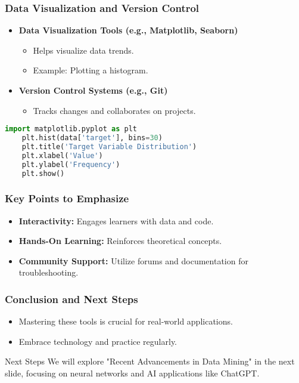 \documentclass[aspectratio=169]{beamer}
\begin{document}
\begin{frame}[fragile]
    \frametitle{Data Visualization and Version Control}
    \begin{itemize}
        \item \textbf{Data Visualization Tools (e.g., Matplotlib, Seaborn)}
            \begin{itemize}
                \item Helps visualize data trends.
                \item Example: Plotting a histogram.
            \end{itemize}
        \item \textbf{Version Control Systems (e.g., Git)}
            \begin{itemize}
                \item Tracks changes and collaborates on projects.
            \end{itemize}
    \end{itemize}
    
    \begin{lstlisting}[language=Python]
    import matplotlib.pyplot as plt
    plt.hist(data['target'], bins=30)
    plt.title('Target Variable Distribution')
    plt.xlabel('Value')
    plt.ylabel('Frequency')
    plt.show()
    \end{lstlisting}
\end{frame}

\begin{frame}
    \frametitle{Key Points to Emphasize}
    \begin{itemize}
        \item \textbf{Interactivity:} Engages learners with data and code.
        \item \textbf{Hands-On Learning:} Reinforces theoretical concepts.
        \item \textbf{Community Support:} Utilize forums and documentation for troubleshooting.
    \end{itemize}
\end{frame}

\begin{frame}
    \frametitle{Conclusion and Next Steps}
    \begin{itemize}
        \item Mastering these tools is crucial for real-world applications.
        \item Embrace technology and practice regularly.
    \end{itemize}
    
    \begin{block}{Next Steps}
        We will explore "Recent Advancements in Data Mining" in the next slide, focusing on neural networks and AI applications like ChatGPT.
    \end{block}
\end{frame}
\end{document}
